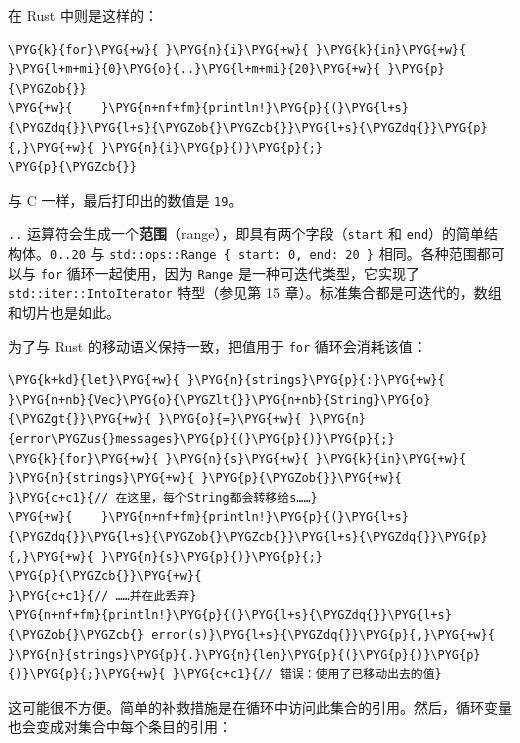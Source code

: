在 Rust 中则是这样的：

\begin{Verbatim}[commandchars=\\\{\},breaklines=true,breakanywhere=true,fontsize=\codefont,xleftmargin=17bp]
\PYG{k}{for}\PYG{+w}{ }\PYG{n}{i}\PYG{+w}{ }\PYG{k}{in}\PYG{+w}{ }\PYG{l+m+mi}{0}\PYG{o}{..}\PYG{l+m+mi}{20}\PYG{+w}{ }\PYG{p}{\PYGZob{}}
\PYG{+w}{    }\PYG{n+nf+fm}{println!}\PYG{p}{(}\PYG{l+s}{\PYGZdq{}}\PYG{l+s}{\PYGZob{}\PYGZcb{}}\PYG{l+s}{\PYGZdq{}}\PYG{p}{,}\PYG{+w}{ }\PYG{n}{i}\PYG{p}{)}\PYG{p}{;}
\PYG{p}{\PYGZcb{}}
\end{Verbatim}

与 C 一样，最后打印出的数值是 \texttt{19}。

\texttt{..} 运算符会生成一个\textbf{范围}（range），即具有两个字段（\texttt{start} 和 \texttt{end}）的简单结构体。\texttt{0..20} 与 \texttt{std::ops::Range \{ start: 0, end: 20 \}} 相同。各种范围都可以与 \texttt{for} 循环一起使用，因为 \texttt{Range} 是一种可迭代类型，它实现了 \texttt{std::iter::IntoIterator} 特型（参见第 15 章）。标准集合都是可迭代的，数组和切片也是如此。

为了与 Rust 的移动语义保持一致，把值用于 \texttt{for} 循环会消耗该值：

\begin{Verbatim}[commandchars=\\\{\},breaklines=true,breakanywhere=true,fontsize=\codefont,xleftmargin=17bp]
\PYG{k+kd}{let}\PYG{+w}{ }\PYG{n}{strings}\PYG{p}{:}\PYG{+w}{ }\PYG{n+nb}{Vec}\PYG{o}{\PYGZlt{}}\PYG{n+nb}{String}\PYG{o}{\PYGZgt{}}\PYG{+w}{ }\PYG{o}{=}\PYG{+w}{ }\PYG{n}{error\PYGZus{}messages}\PYG{p}{(}\PYG{p}{)}\PYG{p}{;}
\PYG{k}{for}\PYG{+w}{ }\PYG{n}{s}\PYG{+w}{ }\PYG{k}{in}\PYG{+w}{ }\PYG{n}{strings}\PYG{+w}{ }\PYG{p}{\PYGZob{}}\PYG{+w}{                  }\PYG{c+c1}{// 在这里，每个String都会转移给s……}
\PYG{+w}{    }\PYG{n+nf+fm}{println!}\PYG{p}{(}\PYG{l+s}{\PYGZdq{}}\PYG{l+s}{\PYGZob{}\PYGZcb{}}\PYG{l+s}{\PYGZdq{}}\PYG{p}{,}\PYG{+w}{ }\PYG{n}{s}\PYG{p}{)}\PYG{p}{;}
\PYG{p}{\PYGZcb{}}\PYG{+w}{                                   }\PYG{c+c1}{// ……并在此丢弃}
\PYG{n+nf+fm}{println!}\PYG{p}{(}\PYG{l+s}{\PYGZdq{}}\PYG{l+s}{\PYGZob{}\PYGZcb{} error(s)}\PYG{l+s}{\PYGZdq{}}\PYG{p}{,}\PYG{+w}{ }\PYG{n}{strings}\PYG{p}{.}\PYG{n}{len}\PYG{p}{(}\PYG{p}{)}\PYG{p}{)}\PYG{p}{;}\PYG{+w}{ }\PYG{c+c1}{// 错误：使用了已移动出去的值}
\end{Verbatim}

这可能很不方便。简单的补救措施是在循环中访问此集合的引用。然后，循环变量也会变成对集合中每个条目的引用：

